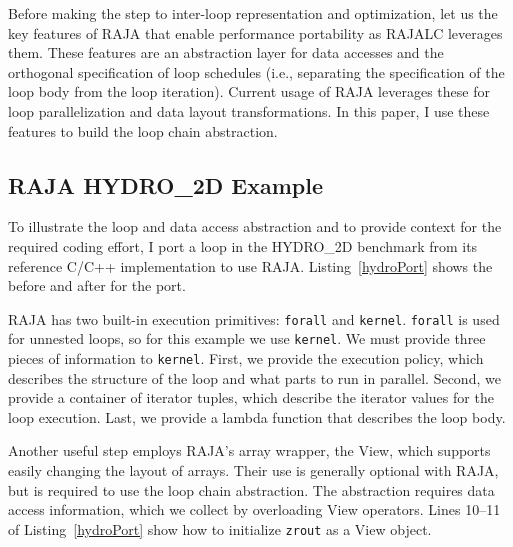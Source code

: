 Before making the step to inter-loop representation and optimization, let us the key features of RAJA that enable performance portability
as RAJALC leverages them.
These features are an abstraction layer for data accesses and the
orthogonal specification of loop schedules
(i.e., separating the specification of the loop body from the loop iteration).
Current usage of RAJA leverages these for loop parallelization and
data layout transformations.
In this paper, I use these features to build the loop chain abstraction.

\subsection{RAJA HYDRO\_2D Example}
To illustrate the loop and data access abstraction and to provide context
for the required coding effort, I port a loop in the HYDRO\_2D benchmark
from its reference C/C++ implementation to use RAJA\@.
Listing~\ref{hydroPort} shows the before and after for the port.

RAJA has two built-in execution primitives: \verb.forall. and \verb.kernel..
\verb.forall. is used for unnested loops, so for this example we use
\verb.kernel..
We must provide three pieces of information to \verb.kernel.. 
First, we provide the execution policy, which describes the structure of
the loop and what parts to run in parallel.
Second, we provide a container of iterator tuples, which describe the
iterator values for the loop execution.
Last, we provide a lambda function that describes the loop body.


Another useful step employs RAJA's array wrapper, the View, which supports
easily changing the layout of arrays.
Their use is generally optional with RAJA, but is required to use the loop
chain abstraction.
The abstraction requires data access information, which we collect by
overloading View operators.
Lines 10--11 of Listing~\ref{hydroPort} show how to initialize \verb.zrout.
as a View object.

